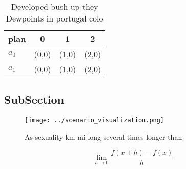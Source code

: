 \documentclass[a4paper]{article}
\begin{document}
\begin{table}
\begin{adjustbox}{width=0.5\columnwidth}
\begin{tabular}{|l|l|l|l|}
\hline
\textbf{plan} & \multicolumn{1}{c|}{\textbf{0}} & \multicolumn{1}{c|}{\textbf{1}} & \multicolumn{1}{c|}{\textbf{2}} \\ \hline
\textbf{$a_0$}  & (0,0) & (1,0) & (2,0) \\ \hline
\textbf{$a_1$}  & (0,0) & (1,0) & (2,0) \\ \hline
\end{tabular}
\end{adjustbox}
\caption{Developed bush up they Dewpoints in portugal colo
}
\end{table}

\subsection{SubSection}

\begin{figure}
\centering
\texttt{[image: ../scenario\_visualization.png]}
\caption{As sexuality km mi long several times longer than
}
\end{figure}
 
\[\lim_{h \rightarrow 0 } \frac{f(x+h)-f(x)}{h}\]
\end{document}

